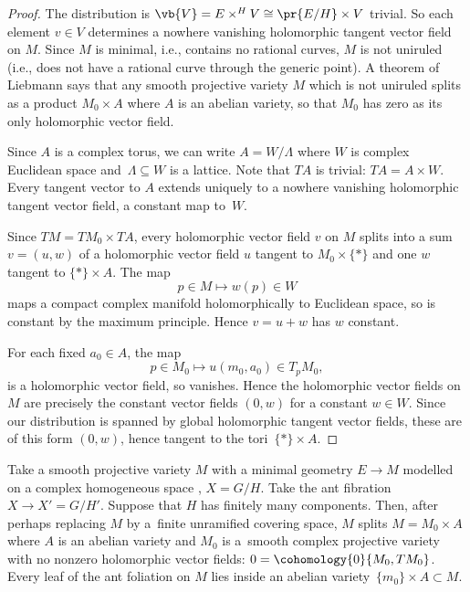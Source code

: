 \begin{proof}
The distribution is $\vb{V} = E \times^H V \cong \pr{E/H} \times V$ trivial.
So each element $v \in V$ determines a nowhere vanishing holomorphic tangent vector field on $M$.
Since $M$ is minimal, i.e., contains no rational curves, $M$ is not uniruled (i.e., does not have a rational curve through the generic point).
A theorem of Liebmann \cite[Theorem 1.1]{Pereira/Touzet:2012} says that any smooth projective variety $M$ which is not uniruled splits as a product $M_0\times A$ where $A$ is an abelian variety, so that $M_0$ has zero as its only holomorphic vector field.

Since $A$ is a complex torus, we can write $A=W/\Lambda$ where $W$ is complex Euclidean space and~$\Lambda\subseteq W$ is a lattice.
Note that $TA$ is trivial: $TA=A\times W$.
Every tangent vector to $A$ extends uniquely to a nowhere vanishing holomorphic tangent vector field, a constant map to~$W$.

Since $TM=TM_0\times TA$, every holomorphic vector field $v$ on $M$ splits into a sum $v=(u,w)$ of a holomorphic vector field $u$ tangent to $M_0\times\{*\}$ and one $w$ tangent to $\{*\}\times A$.
The map
\[
p\in M\mapsto w(p)\in W
\]
maps a compact complex manifold holomorphically to Euclidean space, so is constant by the maximum principle.
Hence $v=u+w$ has $w$ constant.

For each fixed $a_0\in A$, the map
\[
p\in M_0\mapsto u(m_0,a_0)\in T_p M_0,
\]
is a holomorphic vector field, so vanishes.
Hence the holomorphic vector fields on $M$ are precisely the constant vector fields $(0,w)$ for a constant $w\in W$.
Since our distribution is spanned by global holomorphic tangent vector fields, these are of this form $(0,w)$, hence tangent to the tori~$\{*\}\times A$.
\end{proof}

\begin{Corollary}\label{cor:splitting}
Take a smooth projective variety $M$ with a minimal geometry $E \to M$ modelled on a complex
homogeneous space , $X = G/H$.
Take the ant fibration $X \to X' = G/H'$.
Suppose that $H$ has finitely many components.
Then, after perhaps replacing $M$ by a~finite unramified covering space, $M$ splits
$M = M_0 \times A$ where $A$ is an abelian variety and $M_0$ is a~smooth complex projective
variety with no nonzero holomorphic vector fields: $0 = \cohomology{0}{M_0,TM_0}$.
Every leaf of the ant foliation on $M$ lies inside an abelian variety~${\{m_0\} \times A \subset M}$.
\end{Corollary}

